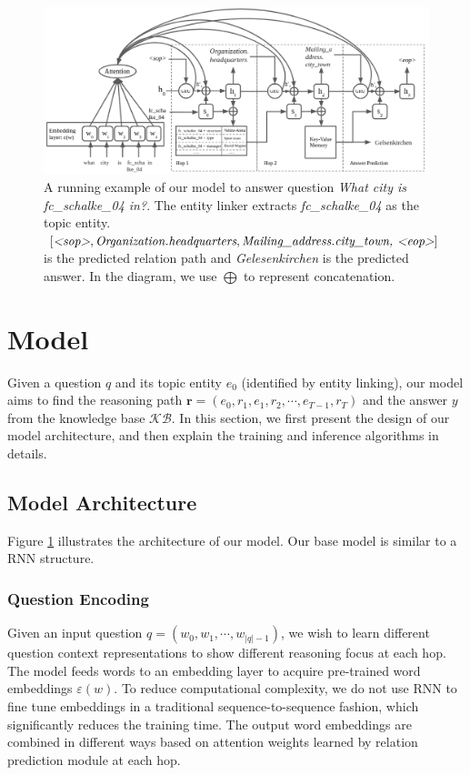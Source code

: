 \begin{figure}[t]
\includegraphics[width=2.1\columnwidth]{figs/model2.png}
\caption{\fontsize{10}{12}\selectfont A running example of our model to answer question \textit{What city is fc\_schalke\_04 in?}. The entity linker extracts \textit{fc\_schalke\_04} as the topic entity. $[\textit{\textless sop\textgreater}, \textit{Organization.headquarters} , \textit{Mailing\_address.city\_town, \textless eop\textgreater}]$ is the predicted relation path and \textit{Gelesenkirchen} is the predicted answer. In the diagram, we use $\bigoplus$ to represent concatenation. }
\label{fig:model}
\end{figure}


\section{Model}
 Given a question $q$ and its topic entity $e_0$ (identified by entity linking), our model aims to find the reasoning path $\mathbf{r} = (e_{0},r_{1},e_{1},r_{2}, \cdots,e_{T-1}, r_{T})$ and the answer $y$ from the knowledge base $\mathcal{KB}$. In this section, we first present the design of our model architecture, and then explain the training and inference algorithms in details.  

\subsection{Model Architecture}


Figure \ref{fig:model} illustrates the architecture of our model. Our base model is similar to a RNN structure.

\subsubsection{Question Encoding} Given an input question $q=(w_0, w_1, \cdots, w_{|q|-1})$, we wish to learn different question context representations to show different reasoning focus at each hop. The model feeds words to an embedding layer to acquire pre-trained word embeddings $\varepsilon(w)$. 
To reduce computational complexity, we do not use RNN to fine tune embeddings in a traditional sequence-to-sequence fashion, which significantly reduces the training time. The output word embeddings are combined in different ways based on attention weights learned by relation prediction module at each hop.


